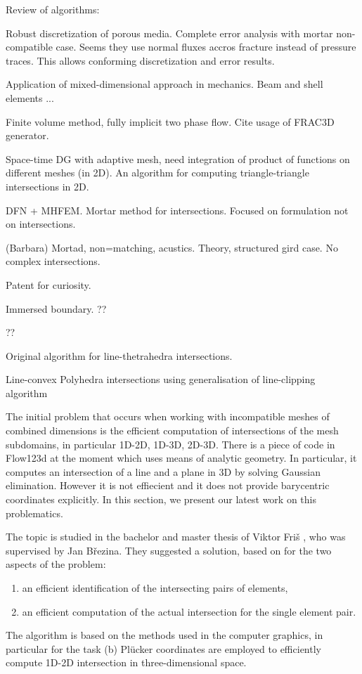 \documentclass{elsarticle}
\newcommand{\plucker}{Pl\"{u}cker}
\begin{document}
Review of algorithms: \cite{gander_algorithm_2009}
 

\cite{boon_robust_2016} Robust discretization of porous media. Complete error analysis with mortar non-compatible case. Seems they use normal fluxes accros
fracture instead of pressure traces. This allows conforming discretization and error results.


\cite{bournival_mesh-geometry_2008} Application of mixed-dimensional approach in mechanics. Beam and shell elements ...

\cite{reichenberger_mixed-dimensional_2006} Finite volume method, fully implicit two phase flow. Cite usage of FRAC3D generator. 

\cite{sladkova_bakalarka} Space-time DG with adaptive mesh, need integration of product of functions on different meshes (in 2D). An algorithm 
for computing triangle-triangle intersections in 2D.

\cite{pichot_generalized_2012} DFN + MHFEM. Mortar method for intersections. Focused on formulation not on intersections. 

\cite{flemisch_non-matching_2012} (Barbara) Mortad, non=matching, acustics. Theory, structured gird case. No complex intersections.

\cite{mustapha_hybrid_2014} Patent for curiosity.

\cite{mittal_immersed_2005} Immersed boundary. ??

\cite{owen_survey_1998} ??

\cite{kuznetsov_overlapping_1998}

\cite{platis_fast_2003} Original algorithm for line-thetrahedra intersections.

\cite{haines_fast_1991} Line-convex Polyhedra intersections using generalisation of line-clipping algorithm



The initial problem that occurs when working with incompatible meshes of combined dimensions is the efficient 
computation of intersections of the mesh subdomains, in particular 1D-2D, 1D-3D, 2D-3D.
There is a piece of code in Flow123d at the moment which uses means of analytic geometry. In particular, it computes 
an intersection of a line and a plane in 3D by solving Gaussian elimination. However it is not effiecient
and it does not provide barycentric coordinates explicitly.
In this section, we present our latest work on this problematics.

The topic is studied in the bachelor and master thesis of Viktor Fri{\v s} \cite{fris_dp_2015}, who was supervised by 
Jan B{\v r}ezina.
They suggested a solution, based on \cite{yuan_efficient_2003} for the two aspects of the problem: 
\begin{enumerate}[itemsep=-3pt]
\item an efficient identification of the intersecting pairs of elements,
\item an efficient computation of the actual intersection for the single element pair.
\end{enumerate}
The algorithm is based on the methods used in the computer graphics, in particular for the task (b) \plucker
coordinates are employed to efficiently compute 1D-2D intersection in three-dimensional space.
\end{document}
